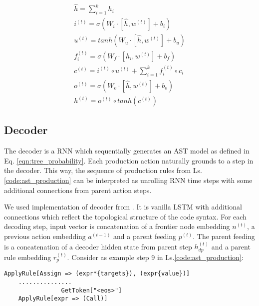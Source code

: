 \begin{equation}
\begin{gathered}
    \hat{h} = \sum^{k}_{i=1}h_i \\
    
    i^{(t)} = \sigma(W_i\cdot[\hat{h}, w^{(t)}]+b_i) \\
    
    u^{(t)} = tanh(W_u\cdot[\hat{h}, w^{(t)}]+b_u) \\
    
    f^{(t)}_i = \sigma(W_{f}\cdot [h_i, w^{(t)}] + b_f) \\
    
    c^{(t)} = i^{(t)} \circ u^{(t)} + \sum_{i=1}^{k} f^{(t)}_i \circ c_i \\
    
    o^{(t)} = \sigma(W_o\cdot[\hat{h}, w^{(t)}]+b_o) \\
    
    h^{(t)} = o^{(t)} \circ tanh(c^{(t)})

\end{gathered}
\label{eq:tree_lstm}
\end{equation}

\subsection{Decoder}
The decoder is a RNN which sequentially generates an AST model as defined in Eq. \ref{eqn:tree_probability}. Each production action naturally grounds to a step in the decoder. This way, the sequence of production rules from Ls. \ref{code:ast_production} can be interpreted as unrolling RNN time steps with some additional connections from parent action steps.

We used implementation of decoder from \cite{Yin2017}. It is vanilla LSTM with additional connections which reflect the topological structure of the code syntax. For each decoding step, input vector is concatenation of a frontier node embedding $n^{(t)}$, a previous action embedding $a^{(t-1)}$ and a parent feeding $p^{(t)}$. The parent feeding is a concatenation of a decoder hidden state from parent step $h_{dp}^{(t)}$ and a parent rule embedding $r_p^{(t)}$. Consider as example step 9 in Ls.\ref{code:ast_production}: 
    
\begin{verbatim}
ApplyRule[Assign => (expr*{targets}), (expr{value})]
    ...............
                GetToken["<eos>"]
    ApplyRule[expr => (Call)]
\end{verbatim}

